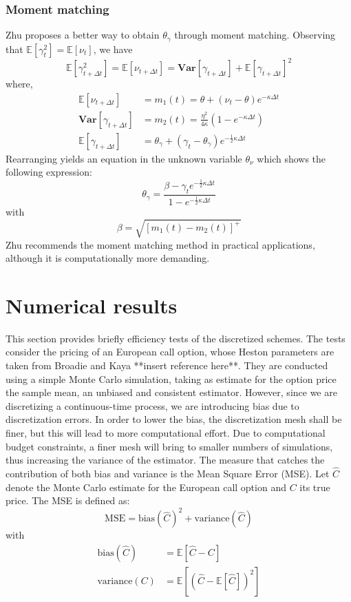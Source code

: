 \documentclass[12pt]{article}
\numberwithin{equation}{section}
\begin{document}
\subsubsection*{Moment matching}
Zhu proposes a better way to obtain $\theta_\gamma$ through moment matching. Observing that $\mathbb{E}[\gamma_t^2]=\mathbb{E}[\nu_t]$, we have
\begin{equation*}
\mathbb{E}[\gamma_{t+\Delta t}^2]=\mathbb{E}[\nu_{t+\Delta t}] =\textbf{Var}[\gamma_{t+\Delta t}] + \mathbb{E}[\gamma	_{t+\Delta t}]^2
\end{equation*}
where,
\begin{align*}
\mathbb{E}[\nu_{t+\Delta t}] &= m_1(t) = \theta + (\nu_t - \theta)e^{-\kappa \Delta t} \\
\textbf{Var}[\gamma_{t+\Delta t}] &=  m_2(t) = \frac{\eta^2}{4\kappa}(1-e^{-\kappa \Delta t}) \\
\mathbb{E}[\gamma_{t+\Delta t}] &= \theta_\gamma + (\gamma_t - \theta_\gamma)e^{-\frac{1}{2}\kappa\Delta t}
\end{align*}
Rearranging yields an equation in the unknown variable $\theta_\nu$ which shows the following expression:
\begin{equation*}
\theta_\gamma = \frac{\beta - \gamma_te^{-\frac{1}{2}\kappa\Delta t}}{1-e^{-\frac{1}{2}\kappa\Delta t}}
\end{equation*}
with
\begin{equation*}
\beta = \sqrt{[m_1(t)-m_2(t)]^+}
\end{equation*}
Zhu recommends the moment matching method in practical applications, although it is computationally more demanding.
\section{Numerical results}
This section provides briefly efficiency tests of the discretized schemes. The tests consider the pricing of an European call option, whose Heston parameters are taken from Broadie and Kaya **insert reference here**. They are conducted using a simple Monte Carlo simulation, taking as estimate for the option price the sample mean, an unbiased and consistent estimator. However, since we are discretizing a continuous-time process, we are introducing bias due to discretization errors. In order to lower the bias, the discretization mesh shall be finer, but this will lead to more computational effort. Due to computational budget constraints, a finer mesh will bring to smaller numbers of simulations, thus increasing the variance of the estimator. The measure that catches the contribution of both bias and variance is the Mean Square Error (MSE). Let $\hat{C}$ denote the Monte Carlo estimate for the European call option and $C$ its true price. The MSE is defined as: \\
\begin{equation}
\text{MSE} = \text{bias}(\hat{C})^2 + \text{variance}(\hat{C})
\end{equation}
with
\begin{align}
\text{bias}(\hat{C}) &= \mathbb{E}[\hat{C}-C] \\
\text{variance}(C) &= \mathbb{E}[(\hat{C}-\mathbb{E}[\hat{C}])^2]
\end{align}
\end{document}
